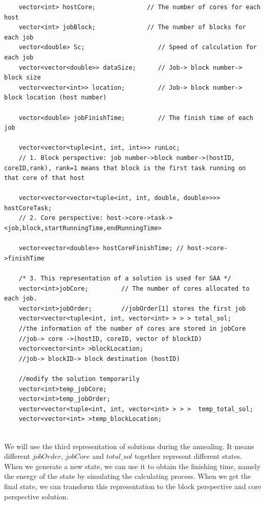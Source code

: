 \documentclass{llncs}
\begin{document}
	\begin{lstlisting}
	vector<int> hostCore;              // The number of cores for each host
	vector<int> jobBlock;              // The number of blocks for each job
	vector<double> Sc;                    // Speed of calculation for each job
	vector<vector<double>> dataSize;      // Job-> block number-> block size
	vector<vector<int>> location;         // Job-> block number-> block location (host number)
	
	vector<double> jobFinishTime;         // The finish time of each job 
	
	vector<vector<tuple<int, int, int>>> runLoc; 
	// 1. Block perspective: job number->block number->(hostID, coreID,rank), rank=1 means that block is the first task running on that core of that host
	
	vector<vector<vector<tuple<int, int, double, double>>>> hostCoreTask; 
	// 2. Core perspective: host->core->task-> <job,block,startRunningTime,endRunningTime>
	
	vector<vector<double>> hostCoreFinishTime; // host->core->finishTime
	
	/* 3. This representation of a solution is used for SAA */
	vector<int>jobCore;  		// The number of cores allocated to each job.
	vector<int>jobOrder;  		//jobOrder[1] stores the first job
	vector<vector<tuple<int, int, vector<int> > > > total_sol;
	//the information of the number of cores are stored in jobCore
	//job-> core ->(hostID, coreID, vector of blockID)
	vector<vector<int> >blockLocation;        
	//job-> blockID-> block destination (hostID)
	
	//modify the solution temporarily
	vector<int>temp_jobCore;
	vector<int>temp_jobOrder;
	vector<vector<tuple<int, int, vector<int> > > >  temp_total_sol;
	vector<vector<int> >temp_blockLocation;
		
	\end{lstlisting}
	
	We will use the third representation of solutions during the annealing. It means different $jobOrder$, $jobCore$ and $total\_sol$ together represent different states. When we generate a new state, we can use it to obtain the finishing time, namely the energy of the state by simulating the calculating process. When we get the final state,  we can transform this representation to the block perspective and core perspective solution. 
	
\end{document}
